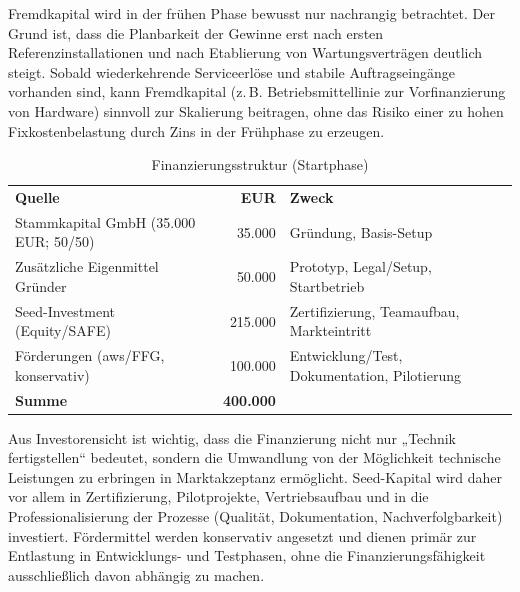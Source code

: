 \documentclass[11pt,a4paper]{article}
\begin{document}
Fremdkapital wird in der frühen Phase bewusst nur nachrangig betrachtet. Der Grund ist, dass die Planbarkeit der Gewinne erst nach ersten Referenzinstallationen und nach Etablierung von Wartungsverträgen deutlich steigt. Sobald wiederkehrende Serviceerlöse und stabile Auftragseingänge vorhanden sind, kann Fremdkapital (z.\,B. Betriebsmittellinie zur Vorfinanzierung von Hardware) sinnvoll zur Skalierung beitragen, ohne das Risiko einer zu hohen Fixkostenbelastung durch Zins in der Frühphase zu erzeugen.

\begin{table}[htbp]
\centering
\caption{Finanzierungsstruktur (Startphase)}
\label{tab:finanzierung}
\renewcommand{\arraystretch}{1.1}
\begin{tabular}{p{} r p{}}
\textbf{Quelle} & \textbf{EUR} & \textbf{Zweck}\\
Stammkapital GmbH (35.000 EUR; 50/50) & 35.000 & Gründung, Basis-Setup\\
Zusätzliche Eigenmittel Gründer & 50.000 & Prototyp, Legal/Setup, Startbetrieb\\
Seed-Investment (Equity/SAFE) & 215.000 & Zertifizierung, Teamaufbau, Markteintritt\\
Förderungen (aws/FFG, konservativ) & 100.000 & Entwicklung/Test, Dokumentation, Pilotierung\\
\textbf{Summe} & \textbf{400.000} & \\
\end{tabular}
\end{table}

Aus Investorensicht ist wichtig, dass die Finanzierung nicht nur „Technik fertigstellen“ bedeutet, sondern die Umwandlung von der Möglichkeit technische Leistungen zu erbringen in Marktakzeptanz ermöglicht. Seed-Kapital wird daher vor allem in Zertifizierung, Pilotprojekte, Vertriebsaufbau und in die Professionalisierung der Prozesse (Qualität, Dokumentation, Nachverfolgbarkeit) investiert. Fördermittel werden konservativ angesetzt und dienen primär zur Entlastung in Entwicklungs- und Testphasen, ohne die Finanzierungsfähigkeit ausschließlich davon abhängig zu machen.
\end{document}
